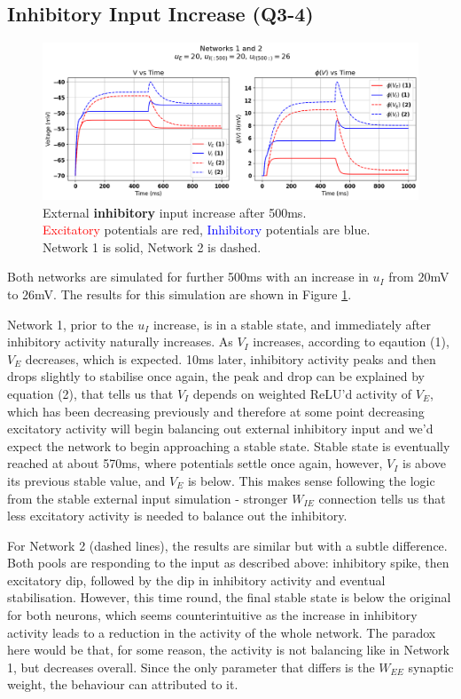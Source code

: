 \documentclass[10pt,twocolumn]{article}
\begin{document}
\subsection{Inhibitory Input Increase (Q3-4)}
\begin{figure}
    \centering
    \captionsetup{justification=centering}
    \includegraphics[width=1\textwidth]{images/12-I_input.png}
    \caption{External \textbf{inhibitory} input increase after 500ms.\\
        \textcolor{red}{Excitatory} potentials are red, \textcolor{blue}{Inhibitory} potentials are blue.\\
        Network 1 is solid, Network 2 is dashed.}
    \label{fig:i-input}
\end{figure}

Both networks are simulated for further 500ms with
an increase in $u_I$ from $20$mV to $26$mV. The results for
this simulation are shown in Figure \ref{fig:i-input}.

Network 1, prior to the $u_I$ increase, is in a stable state, and immediately after
inhibitory activity naturally increases. As $V_I$ increases, according to
eqaution (1), $V_E$ decreases, which is expected. 10ms later, inhibitory activity
peaks and then drops slightly to stabilise once again, the peak and drop can be
explained by equation (2), that tells us that $V_I$ depends on weighted ReLU'd
activity of $V_E$, which has been decreasing previously and therefore at some point
decreasing excitatory activity will begin balancing out external inhibitory input
and we'd expect the network to begin approaching a stable state. Stable state
is eventually reached at about 570ms, where potentials settle once again, however,
$V_I$ is above its previous stable value, and $V_E$ is below. This makes sense
following the logic from the stable external input simulation - stronger $W_{IE}$
connection tells us that less excitatory activity is needed to
balance out the inhibitory.

For Network 2 (dashed lines), the results are similar but with a subtle difference. Both pools
are responding to the input as described above: inhibitory spike, then excitatory dip,
followed by the dip in inhibitory activity and eventual stabilisation. However,
this time round, the final stable state is below the original for both neurons,
which seems counterintuitive as the increase in inhibitory activity leads
to a reduction in the activity of the whole network. The paradox here would
be that, for some reason, the activity is not balancing like in Network 1,
but decreases overall. Since the only parameter that differs is the
$W_{EE}$ synaptic weight, the behaviour can attributed to it.
\end{document}
